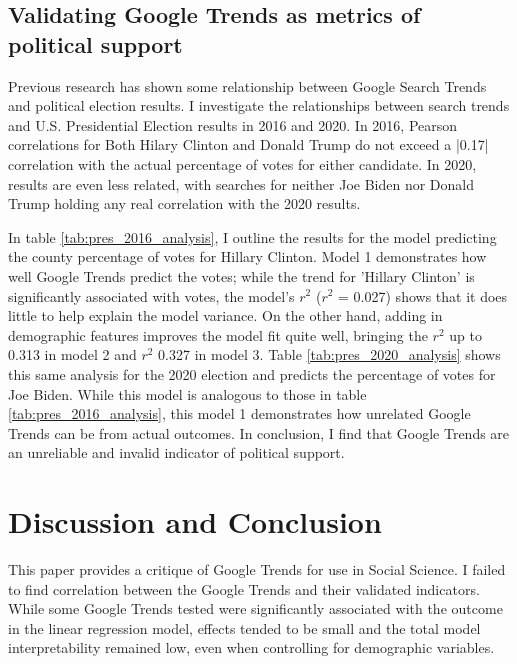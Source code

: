 

\subsection{Validating Google Trends as metrics of political support}

Previous research has shown some relationship between Google Search Trends and
political election results. I investigate the relationships between search trends
and U.S. Presidential Election results in 2016 and 2020. In 2016, Pearson
correlations for Both Hilary Clinton and Donald Trump do not exceed a |0.17|
correlation with the actual percentage of votes for either candidate. In 2020,
results are even less related, with searches for neither Joe Biden nor Donald
Trump holding any real correlation with the 2020 results.

In table \ref{tab:pres_2016_analysis}, I outline the results for the model
predicting the county percentage of votes for Hillary Clinton. Model 1
demonstrates how well Google Trends predict the votes; while the
trend for 'Hillary Clinton' is significantly associated with votes, the model's
$r^2$ ($r^2$ = 0.027) shows that it does little to help explain the model
variance. On the other hand, adding in demographic features improves the model
fit quite well, bringing the $r^2$ up to 0.313 in model 2 and $r^2$ 0.327 in
model 3. Table \ref{tab:pres_2020_analysis} shows this same analysis for the
2020 election and predicts the percentage of votes for Joe Biden. While this
model is analogous to those in table \ref{tab:pres_2016_analysis}, this
model 1 demonstrates how unrelated Google Trends can be from actual outcomes. In
conclusion, I find that Google Trends are an unreliable and invalid indicator of
political support.




\section{Discussion and Conclusion}
This paper provides a critique of Google Trends for use in Social Science. 
I failed to find correlation between the Google Trends and their 
validated indicators. While some Google Trends tested were significantly 
associated with the outcome in the linear regression model, effects tended
to be small and the total model interpretability remained low, even when 
controlling for demographic variables.  


